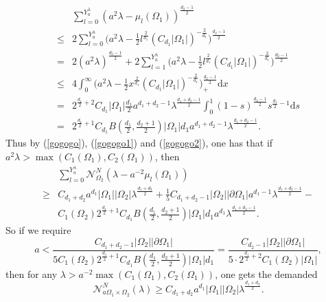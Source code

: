 \documentclass[11pt,letterpaper]{amsart}
\numberwithin{equation}{section}
\theoremstyle{plain}
\theoremstyle{plain}
\numberwithin{equation}{section}
\theoremstyle{remark}
\begin{document}
	\begin{equation}\label{gogogo2}
		\begin{aligned}
			&\sum_{l=0}^{Y_a^\lambda}(a^2\lambda- \mu_l(\Omega_1))^{\frac{d_2-1}{2}}\\
			\le&2\sum_{l=0}^{Y_a^\lambda}\big(a^2\lambda- \frac{1}{2} l^{\frac{2}{d_1}}(C_{d_1}|\Omega_1|)^{-\frac{2}{d_1}} \big)^{\frac{d_2-1}{2}}\\
			=  &2(a^2\lambda)^{\frac{d_2-1}{2}}+ 2\sum_{l=1}^{Y_a^\lambda}\big(a^2\lambda- \frac{1}{2} l^{\frac{2}{d_1}}(C_{d_1}|\Omega_1|)^{-\frac{2}{d_1}} \big)^{\frac{d_2-1}{2}}\\
			\le&4\int_0^\infty \big(a^2\lambda- \frac{1}{2}x^{\frac{2}{d_1}}(C_{d_1}|\Omega_1|)^{-\frac{2}{d_1}} \big)_+^{\frac{d_2-1}{2}} \mathrm{d}x\\
			=  & 2^{\frac{d_1}{2}+2} C_{d_1}|\Omega_1|\frac{d_1}{2}a^{d_1+d_2-1}\lambda^{\frac{d_1+d_2-1}{2}} \int_0^1 (1-s)^{\frac{d_2-1}{2}} s^{\frac{d_1}{2}-1} \mathrm{d}s\\
			=  & 2^{\frac{d_1}{2}+1} C_{d_1} B(\frac{d_1}{2}, \frac{d_2+1}{2})|\Omega_1|d_1 a^{d_1+d_2-1}\lambda^{\frac{d_1+d_2-1}{2}}.
		\end{aligned}
	\end{equation}
	Thus by (\ref{gogogo}), (\ref{gogogo1}) and (\ref{gogogo2}), one has that if $a^2\lambda> \max(C_1(\Omega_1), C_2(\Omega_1))$, then
	\[
	\begin{aligned}
		&\sum_{l=0}^{Y^\lambda_a} \mathcal N^N_{\Omega_2} (\lambda- a^{-2}\mu_l(\Omega_1)) \\
		\ge&C_{d_1+d_2}a^{d_1}|\Omega_1||\Omega_2|\lambda^{\frac{d_1+d_2}{2}}+ \frac{1}{5} C_{d_1+d_2-1} |\Omega_2||\partial \Omega_1| a^{d_1-1}\lambda^{\frac{d_1+d_2-1}{2}}- \\
		&C_1(\Omega_2) 2^{\frac{d_1}{2}+1} C_{d_1} B(\frac{d_1}{2}, \frac{d_2+1}{2})|\Omega_1|d_1 a^{d_1}\lambda^{\frac{d_1+d_2-1}{2}}.
	\end{aligned}
	\]
	So if we require  
	\[
	a< \frac{C_{d_1+d_2-1}|\Omega_2| |\partial \Omega_1|}{5 C_1(\Omega_2) 2^{\frac{d_1}{2}+1} C_{d_1} B(\frac{d_1}{2}, \frac{d_2+1}{2})|\Omega_1|d_1}= \frac{C_{d_2-1}|\Omega_2||\partial \Omega_1|}{5 \cdot 2^{\frac{d_1}{2}+2} C_1(\Omega_2)|\Omega_1|},
	\]
	then for any $\lambda> a^{-2}\max(C_1(\Omega_1), C_2(\Omega_1))$, one gets the demanded
	\[
	\mathcal N^N_{a\Omega_1\times \Omega_2}(\lambda)\ge C_{d_1+d_2}a^{d_1}|\Omega_1||\Omega_2|\lambda^{\frac{d_1+d_2}{2}}.
	\]
	
\end{document}
